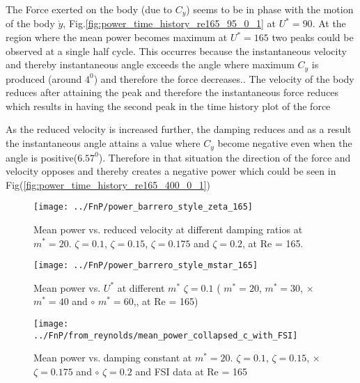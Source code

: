 The Force exerted on the body (due to $C_y$) seems to be in phase with the motion of the body $\dot{y}$, Fig.\ref{fig:power_time_history_re165_95_0_1} at $U^*=90$. At the region where the mean power becomes maximum at $U^*=165$ two peaks could be observed at a single half cycle. This occurres because the instantaneous velocity and thereby instantaneous angle exceeds the angle where maximum $C_y$ is produced (around $4^0$) and therefore the force decreases.. The velocity of the body reduces after attaining the peak and therefore the instantaneous force reduces which results in having the second peak in the time history plot of the force 

As the reduced velocity is increased further, the damping reduces and as a result the instantaneous angle attains a value where $C_y$ become negative even when the angle is positive($6.57^0$). Therefore in that situation the direction of the force and velocity opposes and thereby creates a negative power which could be seen in Fig(\ref{fig:power_time_history_re165_400_0_1})









   

\begin{figure}
\centering
\texttt{[image: ../FnP/power\_barrero\_style\_zeta\_165]}
\caption{Mean power vs. reduced velocity at different damping ratios at $m^*=20$.  $ \zeta = 0.1$,  $\zeta = 0.15$,  $\zeta = 0.175$ and  $\zeta = 0.2$, at Re = 165.}
\label{fig:power_barrero_style_zeta_165}
\end{figure}

\begin{figure}
\centering
\texttt{[image: ../FnP/power\_barrero\_style\_mstar\_165]}
\caption{Mean power vs. $U^*$ at different $m^*$ $\zeta=0.1$ ( $m^*=20$,  $m^*=30$, $\times$ $m^*=40$ and  $\circ$ $m^* = 60$,, at Re = 165)} 
\label{fig:power_barrero_style_mstar_165}
\end{figure}

\begin{figure}[htbp]
\centering
\texttt{[image: ../FnP/from\_reynolds/mean\_power\_collapsed\_c\_with\_FSI]}
\caption{Mean power vs. damping constant at $m^*=20$.  $ \zeta = 0.1$,  $\zeta = 0.15$,   $\times$ $\zeta = 0.175$ and $\circ$ $\zeta = 0.2$ and  FSI data at Re = 165 }
\label{fig:mean_power_collapsed_c_with_FSI}
\end{figure}



